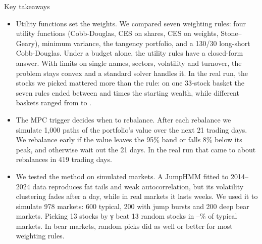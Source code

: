 \begin{frame}{Key takeaways}
  \begin{itemize}
    \setlength{\itemsep}{0.3em}
    \item {\vnmedium Utility functions set the weights.} We compared seven weighting rules: four utility functions
      (Cobb-Douglas, CES on shares, CES on weights, Stone–Geary), minimum variance, the tangency portfolio, and a
      130/30 long-short Cobb-Douglas. Under a budget alone, the utility rules have a closed-form answer. With limits
      on single names, sectors, volatility and turnover, the problem stays convex and a standard solver handles it.
      In the real run, the stocks we picked mattered more than the rule: on one 33-stock basket the seven rules ended
      between \SectorLo{} and \SectorHi{} times the starting wealth, while different baskets ranged from \BasketLo{}
      to \BasketHi{}.
    \item {\vnmedium The MPC trigger decides when to rebalance.} After each rebalance we simulate 1,000 paths of the
      portfolio's value over the next 21 trading days. We rebalance early if the value leaves the 95\% band or falls
      8\% below its peak, and otherwise wait out the 21 days. In the real run that came to about \Rebalances{}
      rebalances in 419 trading days.
    \item {\vnmedium We tested the method on simulated markets.} A JumpHMM fitted to 2014–2024 data reproduces fat
      tails and weak autocorrelation, but its volatility clustering fades after a day, while in real markets it
      lasts weeks. We used it to simulate 978 markets: 600
      typical, 200 with jump bursts and 200 deep bear markets. Picking 13 stocks by γ beat 13 random stocks in
      \TypicalLo–\TypicalHi\% of typical markets. In bear markets, random picks did as well or better for most
      weighting rules.
  \end{itemize}
\end{frame}
